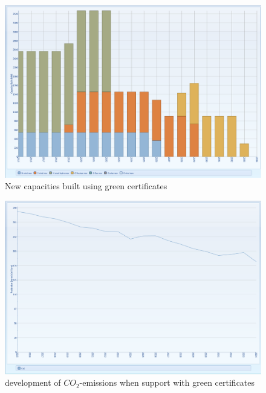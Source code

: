 \documentclass{article}
\begin{document}
\begin{itemize}
\begin{figure}[htbp]
\begin{center}
\includegraphics[width=13cm,keepaspectratio=true]{figures/Expansion/GreenCertificate/CapacityBuiltNewGenGC}
\caption{New capacities built using green certificates}
\label{fig:CapacityBuiltNewGenGC}
\end{center}
\end{figure}
\begin{figure}[htbp]
\begin{center}
\includegraphics[width=13cm,keepaspectratio=true]{figures/Expansion/GreenCertificate/Co2ProductionGC}
\caption{development of $CO_2$-emissions when support with green certificates}
\label{fig:Co2ProductionGC}
\end{center}
\end{figure}
\end{itemize}
\end{document}
